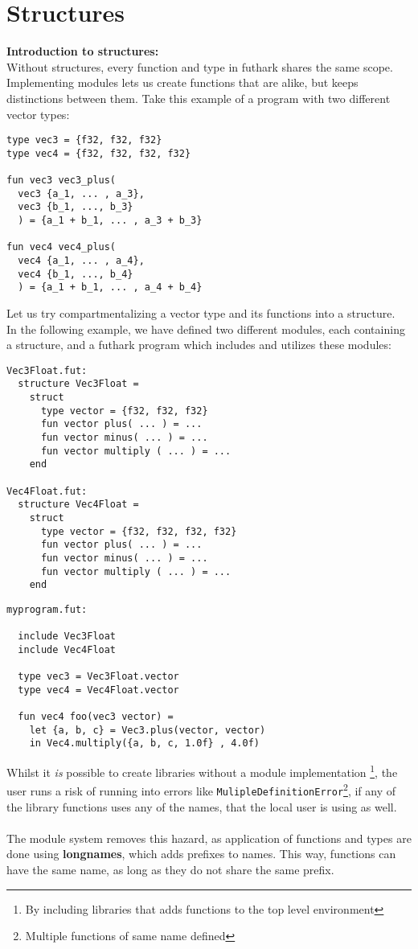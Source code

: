 \section{Structures}
\label{sec:structures}
\textbf{Introduction to structures:}\\
\label{subsec:structuresaregood}
Without structures, every function and type in futhark shares the same scope.
Implementing modules lets us create functions that are alike, but keeps
distinctions between them.
Take this example of a program with two different vector types:

\begin{verbatim}
type vec3 = {f32, f32, f32}
type vec4 = {f32, f32, f32, f32}

fun vec3 vec3_plus(
  vec3 {a_1, ... , a_3}, 
  vec3 {b_1, ..., b_3}
  ) = {a_1 + b_1, ... , a_3 + b_3}

fun vec4 vec4_plus(
  vec4 {a_1, ... , a_4}, 
  vec4 {b_1, ..., b_4}
  ) = {a_1 + b_1, ... , a_4 + b_4}
\end{verbatim}
\noindent
Let us try compartmentalizing a vector type and its functions into a structure.\\
  In the following example, we have defined two different modules, each
containing a structure,
and a futhark program which includes and utilizes these modules:
\begin{verbatim}
Vec3Float.fut:
  structure Vec3Float = 
    struct
      type vector = {f32, f32, f32}
      fun vector plus( ... ) = ...
      fun vector minus( ... ) = ...
      fun vector multiply ( ... ) = ...
    end

Vec4Float.fut:
  structure Vec4Float = 
    struct
      type vector = {f32, f32, f32, f32}
      fun vector plus( ... ) = ...
      fun vector minus( ... ) = ...
      fun vector multiply ( ... ) = ...
    end
\end{verbatim}
\clearpage
\begin{verbatim}
myprogram.fut:

  include Vec3Float
  include Vec4Float

  type vec3 = Vec3Float.vector
  type vec4 = Vec4Float.vector
  
  fun vec4 foo(vec3 vector) = 
    let {a, b, c} = Vec3.plus(vector, vector)
    in Vec4.multiply({a, b, c, 1.0f} , 4.0f)
\end{verbatim}
\noindent
Whilst it \textit{is} possible to create libraries without a module
implementation \footnote{By including libraries that adds functions to the top
  level environment}, the user runs a risk of running into errors like
\texttt{MulipleDefinitionError}\footnote{Multiple functions of same name
  defined}, if any of the library functions uses any of the names, that the
local user is using as well.
\\\\
The module system removes this hazard, as application of functions and types are
done using \textbf{longnames}, which adds prefixes to names. This way, functions
can have the same name, as long as they do not share the same prefix.


